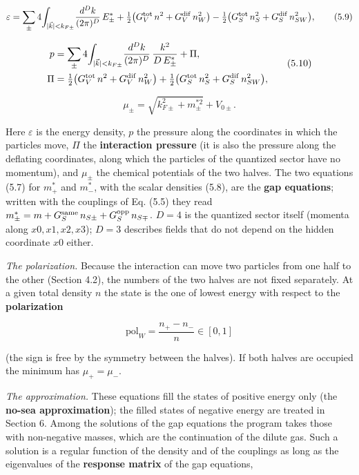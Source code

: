 \documentclass[
  10pt,
]{article}
\begin{document}
\[\varepsilon=\sum_\pm4\!\int_{|\vec k|<k_{F\pm}}\!\frac{d^Dk}{(2\pi)^D}\,E^*_\pm
+\tfrac12\big(G_V^{\rm tot}\,n^2+G_V^{\rm dif}\,n_W^2\big)-\tfrac12\big(G_S^{\rm tot}\,n_S^2+G_S^{\rm dif}\,n_{SW}^2\big),\tag{5.9}\]

\[\begin{aligned}
p&=\sum_\pm4\!\int_{|\vec k|<k_{F\pm}}\!\frac{d^Dk}{(2\pi)^D}\,\frac{k^2}{D\,E^*_\pm}+\Pi,\\
\Pi&=\tfrac12\big(G_V^{\rm tot}\,n^2+G_V^{\rm dif}\,n_W^2\big)+\tfrac12\big(G_S^{\rm tot}\,n_S^2+G_S^{\rm dif}\,n_{SW}^2\big),
\end{aligned}\tag{5.10}\]

\[\mu_\pm=\sqrt{k_{F\pm}^2+m_\pm^{*2}}+V_{0\pm}.\tag{5.11}\]

Here \(\varepsilon\) is the energy density, \(p\) the pressure along the
coordinates in which the particles move, \(\Pi\) the \textbf{interaction
pressure} (it is also the pressure along the deflating coordinates,
along which the particles of the quantized sector have no momentum), and
\(\mu_\pm\) the chemical potentials of the two halves. The two equations
(5.7) for \(m^*_+\) and \(m^*_-\), with the scalar densities (5.8), are
the \textbf{gap equations}; written with the couplings of Eq. (5.5) they
read \(m^*_\pm=m+G_S^{\rm same}\,n_{S\pm}+G_S^{\rm opp}\,n_{S\mp}\).
\(D=4\) is the quantized sector itself (momenta along \(x0,x1,x2,x3\));
\(D=3\) describes fields that do not depend on the hidden coordinate
\(x0\) either.

\emph{The polarization.} Because the interaction can move two particles
from one half to the other (Section 4.2), the numbers of the two halves
are not fixed separately. At a given total density \(n\) the state is
the one of lowest energy with respect to the \textbf{polarization}

\[\mathrm{pol}_W=\frac{n_+-n_-}{n}\in[0,1]\tag{5.12}\]

(the sign is free by the symmetry between the halves). If both halves
are occupied the minimum has \(\mu_+=\mu_-\).

\emph{The approximation.} These equations fill the states of positive
energy only (the \textbf{no-sea approximation}); the filled states of
negative energy are treated in Section 6. Among the solutions of the gap
equations the program takes those with non-negative masses, which are
the continuation of the dilute gas. Such a solution is a regular
function of the density and of the couplings as long as the eigenvalues
of the \textbf{response matrix} of the gap equations,
\end{document}
